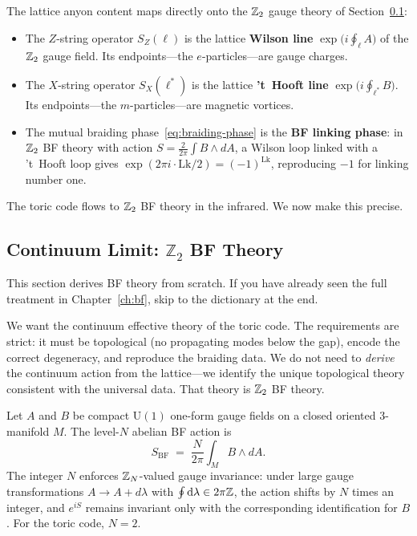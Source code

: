 The lattice anyon content maps directly onto the $\mathbb{Z}_2$ gauge theory of Section~\ref{sec:bf-self-contained}:
\begin{itemize}
    \item The $Z$-string operator $S_Z(\ell)$ is the lattice \textbf{Wilson line} $\exp\bigl(i \oint_\ell A\bigr)$ of the $\mathbb{Z}_2$ gauge field.  Its endpoints---the $e$-particles---are gauge charges.
    \item The $X$-string operator $S_X(\ell^*)$ is the lattice \textbf{'t~Hooft line} $\exp\bigl(i \oint_{\ell^*} B\bigr)$.  Its endpoints---the $m$-particles---are magnetic vortices.
    \item The mutual braiding phase~\eqref{eq:braiding-phase} is the \textbf{BF linking phase}: in $\mathbb{Z}_2$ BF theory with action $S = \frac{2}{2\pi}\int B \wedge dA$, a Wilson loop linked with a 't~Hooft loop gives $\exp(2\pi i \cdot \mathrm{Lk}/2) = (-1)^{\mathrm{Lk}}$, reproducing $-1$ for linking number one.
\end{itemize}
The toric code flows to $\mathbb{Z}_2$ BF theory in the infrared.  We now make this precise.

\subsection{Continuum Limit: $\mathbb{Z}_2$ BF Theory}
\label{sec:bf-self-contained}

\begin{remark}
This section derives BF theory from scratch.  If you have already seen the full treatment in Chapter~\ref{ch:bf}, skip to the dictionary at the end.
\end{remark}

We want the continuum effective theory of the toric code.  The requirements are strict: it must be topological (no propagating modes below the gap), encode the correct degeneracy, and reproduce the braiding data.  We do not need to \emph{derive} the continuum action from the lattice---we identify the unique topological theory consistent with the universal data.  That theory is $\mathbb{Z}_2$ BF theory.

Let $A$ and $B$ be compact $\mathrm{U}(1)$ one-form gauge fields on a closed oriented 3-manifold $M$.  The level-$N$ abelian BF action is
\begin{equation}\label{eq:bf-action-ch9}
    S_{\mathrm{BF}} \;=\; \frac{N}{2\pi} \int_M B \wedge dA.
\end{equation}
The integer $N$ enforces $\mathbb{Z}_N$-valued gauge invariance: under large gauge transformations $A \to A + d\lambda$ with $\oint \mathrm{d}\lambda \in 2\pi\mathbb{Z}$, the action shifts by $N$ times an integer, and $e^{iS}$ remains invariant only with the corresponding identification for $B$.  For the toric code, $N = 2$.

